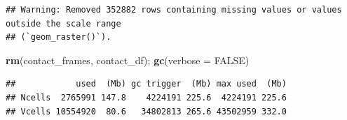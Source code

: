 \documentclass[
]{article}
\newenvironment{Shaded}{\begin{snugshade}}{\end{snugshade}}
\newcommand{\AttributeTok}[1]{\textcolor[rgb]{0.13,0.29,0.53}{#1}}
\newcommand{\ConstantTok}[1]{\textcolor[rgb]{0.56,0.35,0.01}{#1}}
\newcommand{\FunctionTok}[1]{\textcolor[rgb]{0.13,0.29,0.53}{\textbf{#1}}}
\newcommand{\NormalTok}[1]{#1}
\begin{document}
\begin{verbatim}
## Warning: Removed 352882 rows containing missing values or values outside the scale range
## (`geom_raster()`).
\end{verbatim}

\begin{Shaded}
\begin{Highlighting}[]
\FunctionTok{rm}\NormalTok{(contact\_frames, contact\_df); }\FunctionTok{gc}\NormalTok{(}\AttributeTok{verbose =} \ConstantTok{FALSE}\NormalTok{)}
\end{Highlighting}
\end{Shaded}

\begin{verbatim}
##            used  (Mb) gc trigger  (Mb) max used  (Mb)
## Ncells  2765991 147.8    4224191 225.6  4224191 225.6
## Vcells 10554920  80.6   34802813 265.6 43502959 332.0
\end{verbatim}
\end{document}
